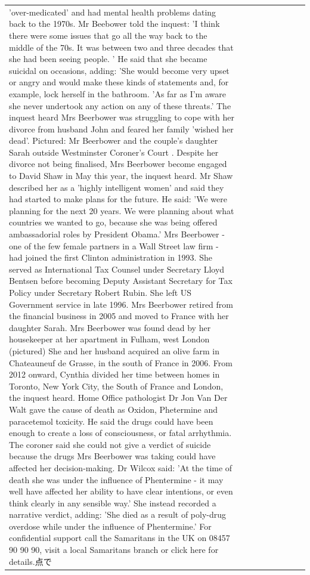 \begin{table}[H]
\begin{tabular}{lllrlllll}
'over-medicated' and had mental health problems dating back to the 1970s. Mr Beebower told the inquest: 'I think there were some issues that go all the way back to the middle of the 70s. It was between two and three decades that she had been seeing people. ' He said that she became suicidal on occasions, adding: 'She would become very upset or angry and would make these kinds of statements and, for example, lock herself in the bathroom. 'As far as I'm aware she never undertook any action on any of these threats.' The inquest heard Mrs Beerbower was struggling to cope with her divorce from husband John and feared her family 'wished her dead'. Pictured: Mr Beerbower and the couple's daughter Sarah outside Westminster Coroner's Court . Despite her divorce not being finalised, Mrs Beerbower become engaged to David Shaw in May this year, the inquest heard. Mr Shaw described her as a 'highly intelligent women' and said they had started to make plans for the future. He said: 'We were planning for the next 20 years. We were planning about what countries we wanted to go, because she was being offered ambassadorial roles by President Obama.' Mrs Beerbower - one of the few female partners in a Wall Street law firm - had joined the first Clinton administration in 1993. She served as International Tax Counsel under Secretary Lloyd Bentsen before becoming Deputy Assistant Secretary for Tax Policy under Secretary Robert Rubin. She left US Government service in late 1996. Mrs Beerbower retired from the financial business in 2005 and moved to France with her daughter Sarah. Mrs Beerbower was found dead by her housekeeper at her apartment in Fulham, west London (pictured) She and her husband acquired an olive farm in Chateauneuf de Grasse, in the south of France in 2006. From 2012 onward, Cynthia divided her time between homes in Toronto, New York City, the South of France and London, the inquest heard. Home Office pathologist Dr Jon Van Der Walt gave the cause of death as Oxidon, Phetermine and paracetemol toxicity. He said the drugs could have been enough to create a loss of consciousness, or fatal arrhythmia. The coroner said she could not give a verdict of suicide because the drugs Mrs Beerbower was taking could have affected her decision-making. Dr Wilcox said: 'At the time of death she was under the influence of Phentermine - it may well have affected her ability to have clear intentions, or even think clearly in any sensible way.' She instead recorded a narrative verdict, adding: 'She died as a result of poly-drug overdose while under the influence of Phentermine.' For confidential support call the Samaritans in the UK on 08457 90 90 90, visit a local Samaritans branch or click here for details.点で \\

\end{tabular}
\end{table}
